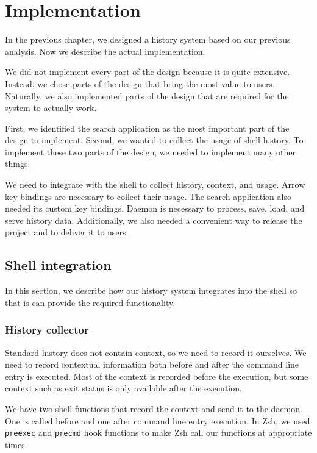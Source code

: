 ﻿\chapter{Implementation}

In the previous chapter, we designed a history system based on our previous analysis. Now we describe the actual implementation. 

We did not implement every part of the design because it is quite extensive. Instead, we chose parts of the design that bring the most value to users. Naturally, we also implemented parts of the design that are required for the system to actually work.

First, we identified the search application as the most important part of the design to implement. Second, we wanted to collect the usage of shell history. To implement these two parts of the design, we needed to implement many other things. 

We need to integrate with the shell to collect history, context, and usage. Arrow key bindings are necessary to collect their usage. The search application also needed its custom key bindings. Daemon is necessary to process, save, load, and serve history data. Additionally, we also needed a convenient way to release the project and to deliver it to users.

\section{Shell integration}

In this section, we describe how our history system integrates into the shell so that is can provide the required functionality. 

\subsection{History collector}

Standard history does not contain context, so we need to record it ourselves. 
We need to record contextual information both before and after the command line entry is executed. Most of the context is recorded before the execution, but some context such as exit status is only available after the execution. 

We have two shell functions that record the context and send it to the daemon. One is called before and one after command line entry execution. In Zsh, we used \verb|preexec| and \verb|precmd| hook functions to make Zsh call our functions at appropriate times. 

